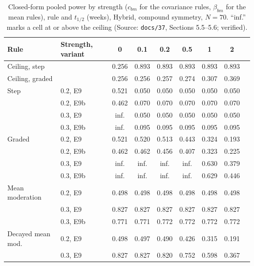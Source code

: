 \documentclass[11pt]{article}
\newcommand{\code}[1]{\texttt{#1}}
\begin{document}
\begin{table}[h]
\centering\small
\caption{Closed-form pooled power by strength ($c_{bm}$ for the
covariance rules, $\beta_{bm}$ for the mean rules), rule and $t_{1/2}$
(weeks), Hybrid, compound symmetry, $N = 70$. ``inf.'' marks a cell at
or above the ceiling (Source: \code{docs/37}, Sections 5.5--5.6;
verified).}
\label{tab:inve-strength}
\begin{tabular}{@{}llccccccc@{}}
\toprule
Rule & Strength, variant & 0 & 0.1 & 0.2 & 0.5 & 1 & 2 \\
\midrule
Ceiling, step   &         & 0.256 & 0.893 & 0.893 & 0.893 & 0.893 & 0.893 \\
Ceiling, graded &         & 0.256 & 0.256 & 0.257 & 0.274 & 0.307 & 0.369 \\
\midrule
Step   & 0.2, E9  & 0.521 & 0.050 & 0.050 & 0.050 & 0.050 & 0.050 \\
       & 0.2, E9b & 0.462 & 0.070 & 0.070 & 0.070 & 0.070 & 0.070 \\
       & 0.3, E9  & inf.  & 0.050 & 0.050 & 0.050 & 0.050 & 0.050 \\
       & 0.3, E9b & inf.  & 0.095 & 0.095 & 0.095 & 0.095 & 0.095 \\
Graded & 0.2, E9  & 0.521 & 0.520 & 0.513 & 0.443 & 0.324 & 0.193 \\
       & 0.2, E9b & 0.462 & 0.462 & 0.456 & 0.407 & 0.323 & 0.225 \\
       & 0.3, E9  & inf.  & inf.  & inf.  & inf.  & 0.630 & 0.379 \\
       & 0.3, E9b & inf.  & inf.  & inf.  & inf.  & 0.629 & 0.446 \\
Mean moderation & 0.2, E9  & 0.498 & 0.498 & 0.498 & 0.498 & 0.498 & 0.498 \\
       & 0.3, E9  & 0.827 & 0.827 & 0.827 & 0.827 & 0.827 & 0.827 \\
       & 0.3, E9b & 0.771 & 0.771 & 0.772 & 0.772 & 0.772 & 0.772 \\
Decayed mean mod. & 0.2, E9 & 0.498 & 0.497 & 0.490 & 0.426 & 0.315 & 0.191 \\
       & 0.3, E9  & 0.827 & 0.827 & 0.820 & 0.752 & 0.598 & 0.367 \\
\bottomrule
\end{tabular}
\end{table}
\end{document}
